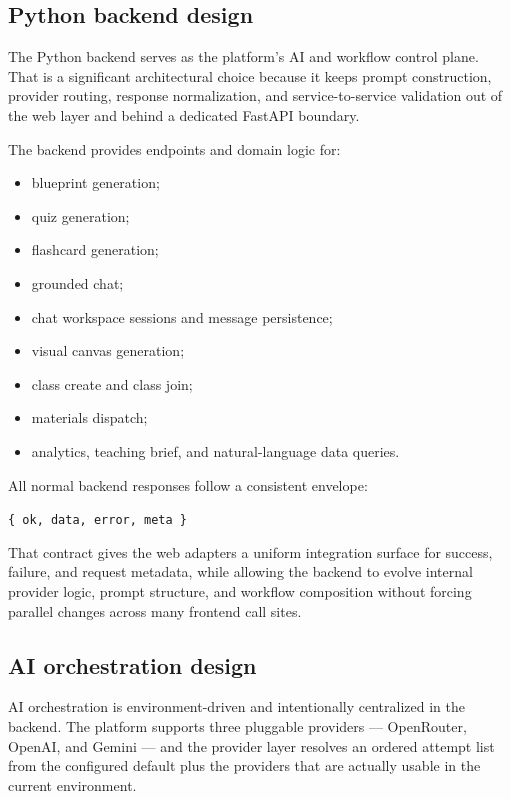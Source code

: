 \documentclass[11pt,a4paper]{article}
\begin{document}
\subsection{Python backend design}

The Python backend serves as the platform's AI and workflow control plane. That is a significant
architectural choice because it keeps prompt construction, provider routing, response normalization,
and service-to-service validation out of the web layer and behind a dedicated FastAPI boundary.

The backend provides endpoints and domain logic for:
\begin{itemize}
  \item blueprint generation;
  \item quiz generation;
  \item flashcard generation;
  \item grounded chat;
  \item chat workspace sessions and message persistence;
  \item visual canvas generation;
  \item class create and class join;
  \item materials dispatch;
  \item analytics, teaching brief, and natural-language data queries.
\end{itemize}

All normal backend responses follow a consistent envelope:
\begin{center}
\texttt{\{ ok, data, error, meta \}}
\end{center}

That contract gives the web adapters a uniform integration surface for success, failure, and
request metadata, while allowing the backend to evolve internal provider logic, prompt structure,
and workflow composition without forcing parallel changes across many frontend call sites.

\subsection{AI orchestration design}

AI orchestration is environment-driven and intentionally centralized in the backend. The platform
supports three pluggable providers --- OpenRouter, OpenAI, and Gemini --- and the provider layer
resolves an ordered attempt list from the configured default plus the providers that are actually
usable in the current environment.
\end{document}
